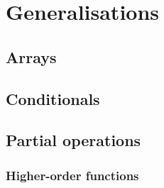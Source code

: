 \section{Generalisations}

\subsection{Arrays}

\subsection{Conditionals} 

\subsection{Partial operations} 

\subsubsection{Higher-order functions}
